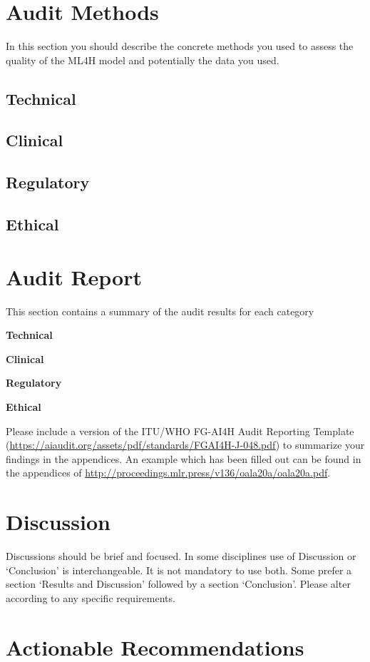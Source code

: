\documentclass[ml4h-mathphys]{ml4h-jnl}%
\theoremstyle{thmstyleone}%
\theoremstyle{thmstyletwo}%
\theoremstyle{thmstylethree}%
\begin{document}
\section{Audit Methods}\label{sec11}
In this section you should describe the concrete methods you used to assess the quality of the ML4H model and potentially the data you used.
\subsection{Technical}
\subsection{Clinical}
\subsection{Regulatory}
\subsection{Ethical}

\section{Audit Report}\label{sec111}
This section contains a summary of the audit results for each category

\textbf{Technical}

\textbf{Clinical}

\textbf{Regulatory}

\textbf{Ethical}

Please include a version of the ITU/WHO FG-AI4H Audit Reporting Template (\url{https://aiaudit.org/assets/pdf/standards/FGAI4H-J-048.pdf}) to summarize your findings in the appendices. An example which has been filled out can be found in the appendices of \url{http://proceedings.mlr.press/v136/oala20a/oala20a.pdf}.

\section{Discussion}\label{sec12}
Discussions should be brief and focused. In some disciplines use of Discussion or `Conclusion' is interchangeable. It is not mandatory to use both. Some prefer a section `Results and Discussion' followed by a section `Conclusion'. Please alter according to any specific requirements. 

\section{Actionable Recommendations}\label{sec13}
\end{document}
